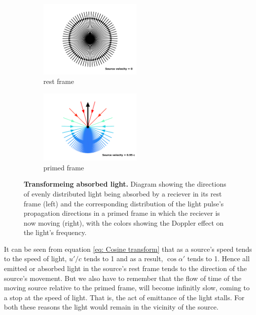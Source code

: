 \begin{figure}[H]
	\begin{subfigure}{.49\textwidth}
		\centering
		\includegraphics[width = 5cm]{images/pdf/Aberrated_velocities_inwards_restframe.pdf}
		\caption{rest frame}
	\end{subfigure}
	\begin{subfigure}{.49\textwidth}
		\centering
		\includegraphics[width = 5cm]{images/pdf/Aberrated_velocities_inwards.pdf}
		\caption{primed frame}
	\end{subfigure}
	\caption{\textbf{Transformeing absorbed light.} Diagram showing the directions of evenly distributed light being absorbed by a reciever in its rest frame (left) and the corresponding distribution of the light pulse's propagation directions in a primed frame in which the reciever is now moving (right), with the colors showing the Doppler effect on the light's frequency.}
	\label{fig: aberrated absorbed light}
\end{figure}

It can be seen from equation \eqref{eq: Cosine transform} that as a source's speed tends to the speed of light, $u'/c$ tends to 1 and as a result, $\cos\alpha{'}$ tends to 1.
Hence all emitted or absorbed light in the source's rest frame tends to the direction of the source's movement.
But we also have to remember that the flow of time of the moving source relative to the primed frame, will become infinitly slow, coming to a stop at the speed of light.
That is, the act of emittance of the light stalls.
For both these reasons the light would remain in the vicinity of the source.

